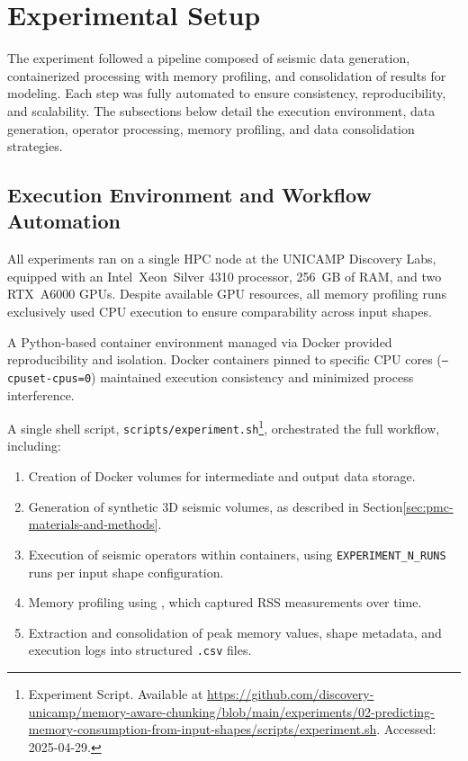\section{Experimental Setup}
\label{sec:pmc-experimental-setup}

The experiment followed a pipeline composed of seismic data generation, containerized processing with memory profiling, and consolidation of results for modeling.
Each step was fully automated to ensure consistency, reproducibility, and scalability.
The subsections below detail the execution environment, data generation, operator processing, memory profiling, and data consolidation strategies.

\subsection{Execution Environment and Workflow Automation}
\label{subsec:pmc-execution-environment-and-workflow-automation}

All experiments ran on a single \ac{HPC} node at the \ac{UNICAMP} Discovery Labs, equipped with an Intel\textregistered\ Xeon\textregistered\ Silver 4310 processor, 256~\ac{GB} of \ac{RAM}, and two \ac{RTX}~A6000 \ac{GPU}s.
Despite available \ac{GPU} resources, all memory profiling runs exclusively used \ac{CPU} execution to ensure comparability across input shapes.

A Python-based container environment managed via Docker provided reproducibility and isolation.
Docker containers pinned to specific \ac{CPU} cores (\texttt{–cpuset-cpus=0}) maintained execution consistency and minimized process interference.

A single shell script, \texttt{scripts/experiment.sh}\footnote{Experiment Script. Available at \url{https://github.com/discovery-unicamp/memory-aware-chunking/blob/main/experiments/02-predicting-memory-consumption-from-input-shapes/scripts/experiment.sh}. Accessed: 2025-04-29.}, orchestrated the full workflow, including:
\begin{enumerate}
    \item Creation of Docker volumes for intermediate and output data storage.
    \item Generation of synthetic \ac{3D} seismic volumes, as described in Section\ref{sec:pmc-materials-and-methods}.
    \item Execution of seismic operators within containers, using \texttt{EXPERIMENT\_N\_RUNS} runs per input shape configuration.
    \item Memory profiling using \traceq, which captured \ac{RSS} measurements over time.
    \item Extraction and consolidation of peak memory values, shape metadata, and execution logs into structured \texttt{.csv} files.
\end{enumerate}

